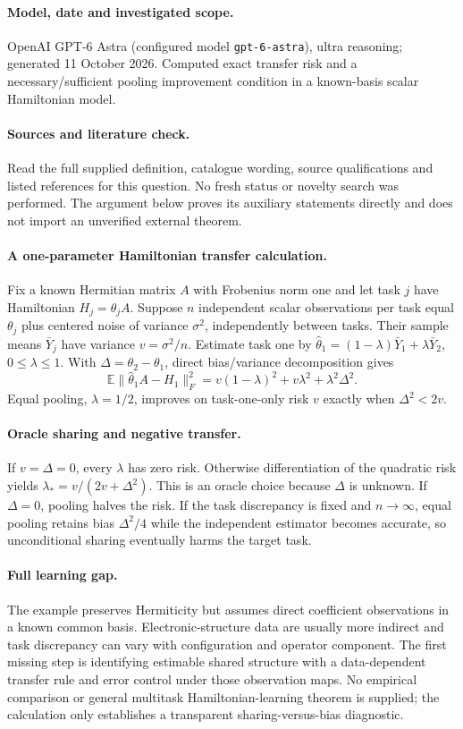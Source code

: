\documentclass[11pt]{article}
\begin{document}
\paragraph{Model, date and investigated scope.}
OpenAI GPT-6 Astra (configured model \texttt{gpt-6-astra}), ultra reasoning; generated 11 October 2026. Computed exact transfer risk and a necessary/sufficient pooling improvement condition in a known-basis scalar Hamiltonian model.

\paragraph{Sources and literature check.}
Read the full supplied definition, catalogue wording, source qualifications and listed references for this question. No fresh status or novelty search was performed. The argument below proves its auxiliary statements directly and does not import an unverified external theorem.

\paragraph{A one-parameter Hamiltonian transfer calculation.} Fix a known Hermitian matrix \(A\) with Frobenius norm one and let task \(j\) have Hamiltonian \(H_j=\theta_j A\). Suppose \(n\) independent scalar observations per task equal \(\theta_j\) plus centered noise of variance \(\sigma^2\), independently between tasks. Their sample means \(\bar Y_j\) have variance \(v=\sigma^2/n\). Estimate task one by \(\widehat\theta_1=(1-\lambda)\bar Y_1+\lambda\bar Y_2\), \(0\leq\lambda\leq1\). With \(\Delta=\theta_2-\theta_1\), direct bias/variance decomposition gives
\[
 \mathbb E\|\widehat\theta_1A-H_1\|_F^2
 =v(1-\lambda)^2+v\lambda^2+\lambda^2\Delta^2.
\]
Equal pooling, \(\lambda=1/2\), improves on task-one-only risk \(v\) exactly when \(\Delta^2<2v\).
\paragraph{Oracle sharing and negative transfer.} If \(v=\Delta=0\), every \(\lambda\) has zero risk. Otherwise differentiation of the quadratic risk yields \(\lambda_*=v/(2v+\Delta^2)\). This is an oracle choice because \(\Delta\) is unknown. If \(\Delta=0\), pooling halves the risk. If the task discrepancy is fixed and \(n\to\infty\), equal pooling retains bias \(\Delta^2/4\) while the independent estimator becomes accurate, so unconditional sharing eventually harms the target task.
\paragraph{Full learning gap.} The example preserves Hermiticity but assumes direct coefficient observations in a known common basis. Electronic-structure data are usually more indirect and task discrepancy can vary with configuration and operator component. The first missing step is identifying estimable shared structure with a data-dependent transfer rule and error control under those observation maps. No empirical comparison or general multitask Hamiltonian-learning theorem is supplied; the calculation only establishes a transparent sharing-versus-bias diagnostic.
\end{document}
